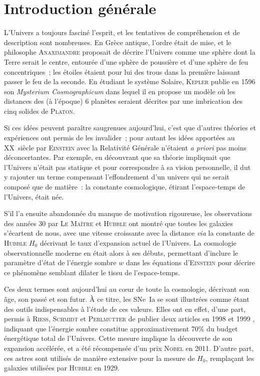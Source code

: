 \documentclass[../main/main.tex]{subfiles}
\begin{document}
\chapter*{Introduction g\'en\'erale}

L'Univers a toujours fasciné l'esprit, et les tentatives de compréhension et de
description sont nombreuses. En Grèce antique, l'ordre était de mise, et le
philosophe \textsc{Anaximandre} proposait de décrire l'Univers comme une sphère
dont la Terre serait le centre, entourée d'une sphère de poussière et d'une
sphère de feu concentriques~; les étoiles étaient pour lui des trous dans la
première laissant passer le feu de la seconde. En étudiant le système Solaire,
\textsc{Kepler} publie en 1596 son \textit{Mysterium Cosmographicum} dans lequel
il en propose un modèle où les distances des (à l'époque) 6 planètes seraient
décrites par une imbrication des cinq solides de \textsc{Platon}.

Si ces idées peuvent paraître saugrenues aujourd'hui, c'est que d'autres
théories et expériences ont permis de les invalider~; pour autant les idées
apportées au XX\ieme\ siècle par \textsc{Einstein} avec la Relativité Générale
\citep{einstein1915} n'étaient \textit{a priori} pas moins déconcertantes. Par
exemple, en découvrant que sa théorie impliquait que l'Univers n'était pas
statique et pour correspondre à sa vision personnelle, il dut y rajouter un
terme compensant l'effondrement d'un univers qui ne serait composé que de
matière~: la constante cosmologique, étirant l'espace-temps de l'Univers, était
née.

S'il l'a ensuite abandonnée du manque de motivation rigoureuse, les observations
des années 30 par \textsc{Le Maître} et \textsc{Hubble} \citep{hubble1929} ont
montré que toutes les galaxies s'écartent de nous, avec une vitesse croissante
avec la distance \textit{via} la constante de \textsc{Hubble} $H_0$ décrivant le
taux d'expansion actuel de l'Univers. La cosmologie observationnelle moderne en
était alors à ses débuts, permettant d'inclure le paramètre d'état de l'énergie
sombre $w$ dans les équations d'\textsc{Einstein} pour décrire ce phénomène
semblant dilater le tissu de l'espace-temps.

Ces deux termes sont aujourd'hui au cœur de toute la cosmologie, décrivant son
âge, son passé et son futur. À ce titre, les SNe~Ia se sont illustrées comme
étant des outils indispensables à l'étude de ces valeurs. Elles ont en effet,
d'une part, permis à \textsc{Riess}, \textsc{Schmidt} et \textsc{Perlmutter} de
publier deux articles en 1998 et 1999 \citep{riess1998, perlmutter1999},
indiquant que l'énergie sombre constitue approximativement 70\% du budget
énergétique total de l'Univers. Cette mesure implique la découverte de son
expansion accélérée, et a été récompensée d'un prix \textsc{Nobel} en 2011.
D'autre part, ces astres sont utilisés de manière extensive pour la mesure de
$H_0$, remplaçant les galaxies utilisées par \textsc{Hubble} en 1929.
\end{document}
